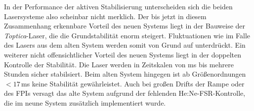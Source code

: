 In der Performance der aktiven Stabilisierung unterscheiden sich die beiden
Lasersysteme also scheinbar nicht merklich. Der bis jetzt in diesem
Zusammenhang erkennbare Vorteil des neuen Systems liegt in der Bauweise der \textit{Toptica}-Laser, die die Grundstabilität enorm steigert. Fluktuationen wie im Falle des Lasers aus dem
alten System werden somit von Grund auf unterdrückt. Ein weiterer nicht
offensichtlicher Vorteil des neuen Systems liegt in der doppelten Kontrolle der
Stabilität. Die Laser werden in Zeitskalen von ms bis mehrere
Stunden sicher stabilsiert. Beim alten System hingegen ist ab Größenordnungen
$<17\,$ms keine Stabilität gewährleistet. Auch bei großen Drifts der Rampe oder
des FPIs versagt das alte System aufgrund der fehlenden He:Ne-FSR-Kontrolle, die
im neune System zusätzlich implementiert wurde.

